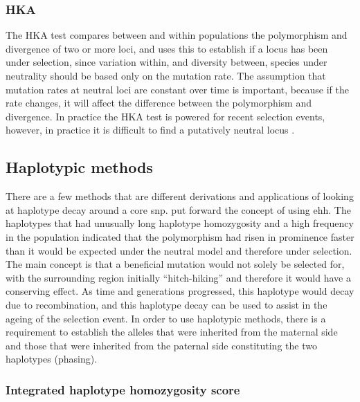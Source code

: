 \documentclass[twoside,openright]{report}
\begin{document}
\subsubsection{HKA}\label{hka}

The HKA test \citep{Hudson1987} compares between and within populations
the polymorphism and divergence of two or more loci, and uses this to
establish if a locus has been under selection, since variation within,
and diversity between, species under neutrality should be based only on
the mutation rate. The assumption that mutation rates at neutral loci
are constant over time is important, because if the rate changes, it
will affect the difference between the polymorphism and divergence. In
practice the HKA test is powered for recent selection events, however,
in practice it is difficult to find a putatively neutral locus
\citep{Zhai2009}.

\subsection{Haplotypic methods}\label{haplotypic-methods}

There are a few methods that are different derivations and applications
of looking at haplotype decay around a core \gls{snp}.
\citet{sabeti2006positive} put forward the concept of using \gls{ehh}.
The haplotypes that had unusually long haplotype homozygosity and a high
frequency in the population indicated that the polymorphism had risen in
prominence faster than it would be expected under the neutral model and
therefore under selection. The main concept is that a beneficial
mutation would not solely be selected for, with the surrounding region
initially ``hitch-hiking'' and therefore it would have a conserving
effect. As time and generations progressed, this haplotype would decay
due to recombination, and this haplotype decay can be used to assist in
the ageing of the selection event. In order to use haplotypic methods,
there is a requirement to establish the alleles that were inherited from
the maternal side and those that were inherited from the paternal side
constituting the two haplotypes (phasing).

\subsubsection{Integrated haplotype homozygosity
score}\label{integrated-haplotype-homozygosity-score}
\end{document}
